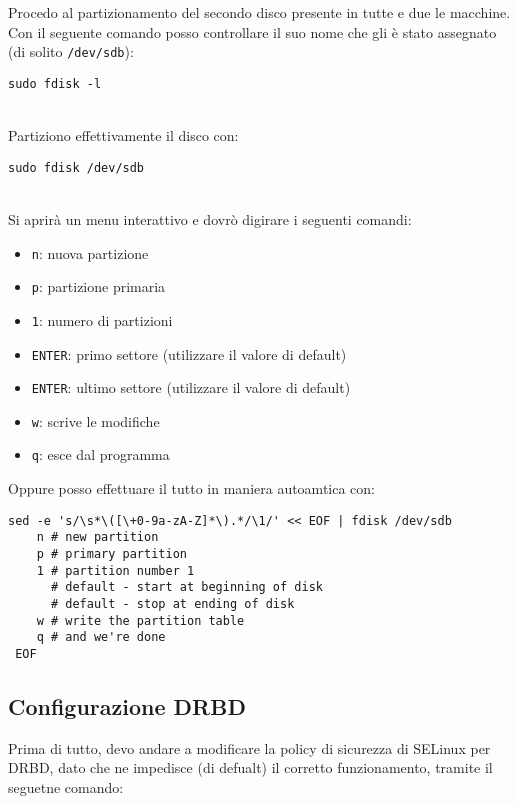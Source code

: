 Procedo al partizionamento del secondo disco presente in tutte e due le macchine.\\
Con il seguente comando posso controllare il suo nome che gli \`{e} stato assegnato (di solito \lstinline[style=cmd]|/dev/sdb|):

\begin{lstlisting}[style=cmd]
 sudo fdisk -l
\end{lstlisting}
\ \\
Partiziono effettivamente il disco con:

\begin{lstlisting}[style=cmd]
 sudo fdisk /dev/sdb
\end{lstlisting}
\ \\
Si aprir\`{a} un menu interattivo e dovr\`{o} digirare i seguenti comandi:

\begin{itemize}
	\item \lstinline[style=cmd]|n|: nuova partizione
	\item \lstinline[style=cmd]|p|: partizione primaria
	\item \lstinline[style=cmd]|1|: numero di partizioni
	\item \lstinline[style=cmd]|ENTER|: primo settore (utilizzare il valore di default)
	\item \lstinline[style=cmd]|ENTER|: ultimo settore (utilizzare il valore di default)
	\item \lstinline[style=cmd]|w|: scrive le modifiche
	\item \lstinline[style=cmd]|q|: esce dal programma
\end{itemize}
\pagebreak
Oppure posso effettuare il tutto in maniera autoamtica con:

\begin{lstlisting}[style=cmd]
 sed -e 's/\s*\([\+0-9a-zA-Z]*\).*/\1/' << EOF | fdisk /dev/sdb
    n # new partition
    p # primary partition
    1 # partition number 1
      # default - start at beginning of disk 
      # default - stop at ending of disk 
    w # write the partition table
    q # and we're done
 EOF
\end{lstlisting}

\subsection{Configurazione DRBD}

Prima di tutto, devo andare a modificare la policy di sicurezza di SELinux per DRBD, dato che ne impedisce (di defualt) il corretto funzionamento, tramite il seguetne comando:

